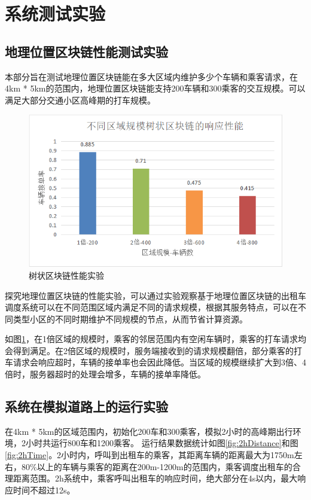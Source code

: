\section{系统测试实验}
\subsection{地理位置区块链性能测试实验}
本部分旨在测试地理位置区块链能在多大区域内维护多少个车辆和乘客请求，在4km * 5km的范围内，地理位置区块链能支持200车辆和300乘客的交互规模。可以满足大部分交通小区高峰期的打车规模。

\begin{figure}
  \centering
  \includegraphics[width=1.0\textwidth]{figures/treeBlockchcainPerformance}
  \caption{树状区块链性能实验}\label{fig:treeBlockchcainPerformance}
\end{figure}

探究地理位置区块链的性能实验，可以通过实验观察基于地理位置区块链的出租车调度系统可以在不同范围区域内满足不同的请求规模，根据其服务特点，可以在不同类型小区的不同时期维护不同规模的节点，从而节省计算资源。

如图\ref{fig:treeBlockchcainPerformance}，在1倍区域的规模时，乘客的邻居范围内有空闲车辆时，乘客的打车请求均会得到满足。在2倍区域的规模时，服务端接收到的请求规模翻倍，部分乘客的打车请求会响应超时，车辆的接单率也会因此降低。当区域的规模继续扩大到3倍、4倍时，服务器超时的处理会增多，车辆的接单率降低。

\subsection{系统在模拟道路上的运行实验}
在4km * 5km的区域范围内，初始化200车和300乘客，模拟2小时的高峰期出行环境，2小时共运行800车和1200乘客。
运行结果数据统计如图\ref{fig:2hDistance}和图\ref{fig:2hTime}。2小时内，呼叫到出租车的乘客，其距离车辆的距离最大为1750m左右，80$\%$以上的车辆与乘客的距离在200m-1200m的范围内，乘客调度出租车的合理距离范围。2h系统中，乘客呼叫出租车的响应时间，绝大部分在4s以内，最大响应时间不超过12s。

